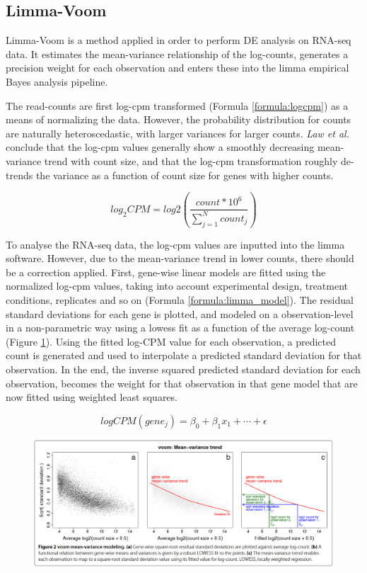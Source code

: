 \subsection{Limma-Voom}

Limma-Voom is a method applied in order to perform DE analysis on RNA-seq data.
It estimates the mean-variance relationship of the log-counts, generates a precision weight for each observation and enters these into the limma empirical Bayes analysis pipeline.

The read-counts are first log-cpm transformed (Formula \ref{formula:logcpm}) as a means of normalizing the data.
However, the probability distribution for counts are naturally heteroscedastic, with larger variances for larger counts.
\textit{Law et al.} conclude that the log-cpm values generally show a smoothly decreasing mean-variance trend with count size, and that the log-cpm transformation roughly de-trends the variance as a function of count size for genes with higher counts.

\begin{equation}
    log_2CPM = log2\left(\frac{count * 10^6}{\sum_{j=1}^{N} count_j}\right)
    \label{formula:logcpm}
\end{equation}

To analyse the RNA-seq data, the log-cpm values are inputted into the limma software.
However, due to the mean-variance trend in lower counts, there should be a correction applied.
First, gene-wise linear models are fitted using the normalized log-cpm values, taking into account experimental design, treatment conditions, replicates and so on (Formula \ref{formula:limma_model}).
The residual standard deviations for each gene is plotted, and modeled on a observation-level in a non-parametric way using a lowess fit as a function of the average log-count (Figure \ref{fig:voom_mean_var_trend}).
Using the fitted log-CPM value for each observation, a predicted count is generated and used to interpolate a predicted standard deviation for that observation.
In the end, the inverse squared predicted standard deviation for each observation, becomes the weight for that observation in that gene model that are now fitted using weighted least squares.

\begin{equation}
    logCPM(gene_j) = \beta_0 + \beta_{1}x_{1} + \cdots + \epsilon 
    \label{formula:limma_model}
\end{equation}

\begin{figure}[t]
    \centering
    \includegraphics[width=\textwidth]{figs/voom_mean_var_trend.png}
    \label{fig:voom_mean_var_trend}
\end{figure}

